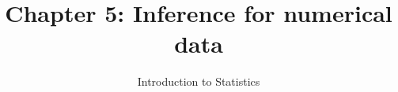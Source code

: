 \documentclass[slidestop,compress,mathserif]{beamer}
\title[Chp 5: Inference for numerical data]{Chapter 5: Inference for numerical data}
\author{Introduction to Statistics}
\date{}
\institute{}
\begin{document}


\begin{frame}[plain]

\titlepage

\end{frame}





%



\end{document}
